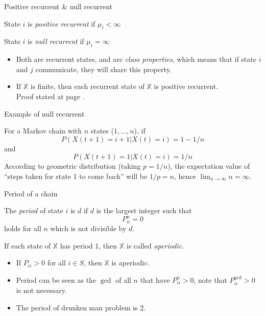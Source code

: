\documentclass{beamer}
\begin{document}
\begin{frame}{Positive recurrent \& null recurrent}
	\begin{definition}
		State $i$ is \textit{positive recurrent} if $\mu_i < \infty$
	\end{definition}
	\begin{definition}
		State $i$ is \textit{null recurrent} if $\mu_i = \infty$
	\end{definition}
	\begin{itemize}
		\item Both are recurrent states, and are \textit{class properties}, which means that if state $i$ and $j$ communicate, they will share this property.
		\item If $\mathbb{X}$ is finite, then each recurrent state of $\mathbb{X}$ is positive recurrent.\\
			Proof stated at page \pageref{finite_pos_rec}.
	\end{itemize}
\end{frame}

\begin{frame}{Example of null recurrent}
	\begin{example}
		For a Markov chain with $n$ states ($1,\ldots,n$), if 
		\[
		P(X(t+1)=i+1|X(t)=i) = 1-1/n
		\]
		and
		\[
		P(X(t+1)=1|X(t)=i) = 1/n
		\]
		According to geometric distribution (taking $p = 1/n$), the expectation value of ``steps taken for state 1 to come back'' will be $1/p = n$, hence $\lim_{n\to\infty} n = \infty$.
	\end{example}
\end{frame}

\begin{frame}{Period of a chain}
	\begin{definition}
		The \textit{period} of state $i$ is $d$ if $d$ is the largest integer such that
		\[
		P^n_{ii} = 0
		\]
		holds for all $n$ which is not divisible by $d$.
	\end{definition}
	\begin{definition}
		If each state of $\mathbb{X}$ has period 1, then $\mathbb{X}$ is called \textit{aperiodic}.
	\end{definition}
	\begin{itemize}
		\item If $P_{ii} > 0$ for all $i \in S$, then $\mathbb{X}$ is aperiodic.
		\item Period can be seen as the $\gcd$ of all $n$ that have $P^n_{ii} > 0$, note that $P^{\gcd}_{ii} > 0$ is not necessary.
		\item The period of drunken man problem is 2.
	\end{itemize}
\end{frame}
\end{document}
